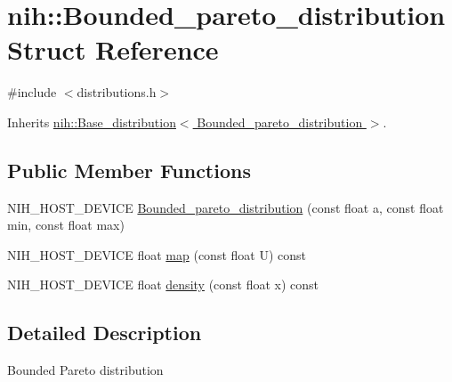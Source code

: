 \hypertarget{structnih_1_1_bounded__pareto__distribution}{
\section{nih\-:\-:\-Bounded\-\_\-pareto\-\_\-distribution \-Struct \-Reference}
\label{structnih_1_1_bounded__pareto__distribution}
}


{\ttfamily \#include $<$distributions.\-h$>$}



\-Inherits \hyperlink{structnih_1_1_base__distribution}{nih\-::\-Base\-\_\-distribution$<$ Bounded\-\_\-pareto\-\_\-distribution $>$}.

\subsection*{\-Public \-Member \-Functions}
\begin{DoxyCompactItemize}
\item 
\-N\-I\-H\-\_\-\-H\-O\-S\-T\-\_\-\-D\-E\-V\-I\-C\-E \hyperlink{structnih_1_1_bounded__pareto__distribution_a9ca7eeb175f3f614b7f2d8a58001e8d7}{\-Bounded\-\_\-pareto\-\_\-distribution} (const float a, const float min, const float max)
\item 
\-N\-I\-H\-\_\-\-H\-O\-S\-T\-\_\-\-D\-E\-V\-I\-C\-E float \hyperlink{structnih_1_1_bounded__pareto__distribution_ab7bcf61d38254eeb3b5898dfdf7b54e5}{map} (const float \-U) const 
\item 
\-N\-I\-H\-\_\-\-H\-O\-S\-T\-\_\-\-D\-E\-V\-I\-C\-E float \hyperlink{structnih_1_1_bounded__pareto__distribution_aecd459146a179522bcae18e18876ba9a}{density} (const float x) const 
\end{DoxyCompactItemize}


\subsection{\-Detailed \-Description}
\-Bounded \-Pareto distribution 

